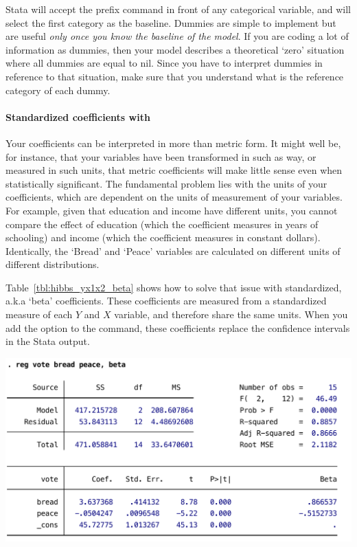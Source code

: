 	Stata will accept the  prefix command in front of any categorical variable, and will select the first category as the baseline. Dummies are simple to implement but are useful \emph{only once you know the baseline of the model}. If you are coding a lot of information as dummies, then your model describes a theoretical `zero' situation where all dummies are equal to nil. Since you have to interpret dummies in reference to that situation, make sure that you understand what is the reference category of each dummy.

  
	\paragraph{Standardized coefficients with }%
	\label{sec:beta}%
	Your coefficients can be interpreted in more than metric form. It might well be, for instance, that your variables have been transformed in such as way, or measured in such units, that metric coefficients will make little sense even when statistically significant. The fundamental problem lies with the units of your coefficients, which are dependent on the units of measurement of your variables. For example, given that education and income have different units, you cannot compare the effect of education (which the coefficient measures in years of schooling) and income (which the coefficient measures in constant dollars). Identically, the `Bread' and `Peace' variables are calculated on different units of different distributions.
	
	Table~\ref{tbl:hibbs_yx1x2_beta} shows how to solve that issue with standardized, a.k.a `beta' coefficients. These coefficients are measured from a standardized measure of each $Y$ and $X$ variable, and therefore share the same units. When you add the  option to the  command, these coefficients replace the confidence intervals in the Stata output.

	\begin{table}[htp]
		\includegraphics[scale=.5]{images/hibbs_yx1x2_beta.pdf}

	  	\caption[Extract from  output (5): Standardized regression coefficients]{\label{tbl:hibbs_yx1x2_beta}%
      Extract from  output (5): Standardized regression coefficients. %
      \hibbs}
	\end{table}%
	
